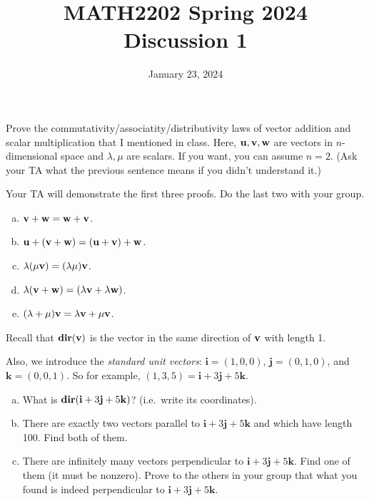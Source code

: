 \documentclass[11pt,oneside]{amsart}
\title{MATH2202 Spring 2024\\
Discussion 1}
\date{January 23, 2024}
\theoremstyle{definition}
\begin{document}
  \maketitle

  \begin{problem}
    Prove the commutativity/associatity/distributivity laws of vector addition and scalar multiplication that I mentioned in class. Here, $\mathbf u,\mathbf v,\mathbf w$ are vectors in $n$-dimensional space and $\lambda,\mu$ are scalars. If you want, you can assume $n=2$. (Ask your TA what the previous sentence means if you didn't understand it.)

    Your TA will demonstrate the first three proofs. Do the last two with your group.
    \begin{enumerate}[(a)]
      \item $\mathbf v+\mathbf w=\mathbf w+\mathbf v$.
      \item $\mathbf u+(\mathbf v+\mathbf w)=(\mathbf u+\mathbf v)+\mathbf w$.
      \item $\lambda(\mu\mathbf v)=(\lambda\mu)\mathbf v$.
      \item $\lambda(\mathbf v+\mathbf w)=(\lambda\mathbf v+\lambda\mathbf w)$.
      \item $(\lambda+\mu)\mathbf v=\lambda\mathbf v+\mu\mathbf v$.
    \end{enumerate}
  \end{problem}

  \begin{problem}
    Recall that $\operatorname{\mathbf{dir}}(\mathbf v)$ is the vector in the same direction of $\mathbf v$ with length 1.

    Also, we introduce the \emph{standard unit vectors}: $\mathbf i=(1,0,0)$, $\mathbf j=(0,1,0)$, and $\mathbf k=(0,0,1)$. So for example, $(1,3,5)=\mathbf i+3\mathbf j+5\mathbf k$.
    \begin{enumerate}[(a)]
      \item What is $\operatorname{\mathbf{dir}}(\mathbf i+3\mathbf j+5\mathbf k)$? (i.e.\ write its coordinates).
      \item There are exactly two vectors parallel to $\mathbf i+3\mathbf j+5\mathbf k$ and which have length 100. Find both of them.
      \item There are infinitely many vectors perpendicular to $\mathbf i+3\mathbf j+5\mathbf k$. Find one of them (it must be nonzero). Prove to the others in your group that what you found is indeed perpendicular to $\mathbf i+3\mathbf j+5\mathbf k$.
    \end{enumerate}
  \end{problem}
\end{document}
